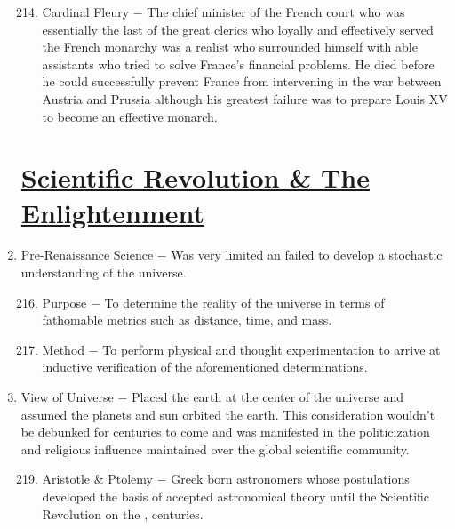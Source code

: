 \documentclass[12pt]{article}
\begin{document}
\begin{enumerate}
\begin{enumerate}[label=\arabic{*}.]
\setcounter{enumii}{213}
 
\item Cardinal Fleury $-$ The chief minister of the French court who was essentially the last of the great clerics who loyally and effectively served the French monarchy was a realist who surrounded himself with able assistants who tried to solve France's financial problems. He died before he could successfully prevent France from intervening in the war between Austria and Prussia although his greatest failure was to prepare Louis XV to become an effective monarch.

\end{enumerate}
\setcounter{enumi}{214}

\section{\underline{Scientific Revolution \& The Enlightenment}}

\item Pre-Renaissance Science $-$ Was very limited an failed to develop a stochastic understanding of the universe. 

\begin{enumerate}[label=\arabic{*}.]
\setcounter{enumii}{215}

\item Purpose $-$ To determine the reality of the universe in terms of fathomable metrics such as distance, time, and mass.

\item Method $-$ To perform physical and thought experimentation to arrive at inductive verification of the aforementioned determinations.

\end{enumerate}
\setcounter{enumi}{217}

\item View of Universe $-$ Placed the earth at the center of the universe and assumed the planets and sun orbited the earth. This consideration wouldn't be debunked for centuries to come and was manifested in the politicization and religious influence maintained over the global scientific community.

\begin{enumerate}[label=\arabic{*}.]
\setcounter{enumii}{218}

\item Aristotle \& Ptolemy $-$ Greek born astronomers whose postulations developed the basis of accepted astronomical theory until the Scientific Revolution on the ,  centuries.


\end{enumerate}
\end{enumerate}
\end{document}
